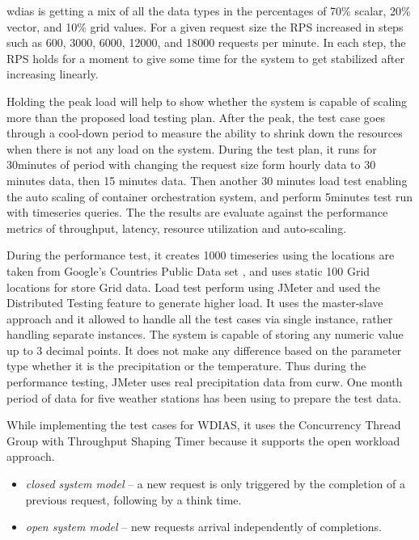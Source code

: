 \documentclass[conference]{IEEEtran}
\begin{document}
\acrshort{wdias} is getting a mix of all the data types in the percentages of 70\% scalar, 20\% vector, and 10\% grid values.
For a given request size the RPS increased in steps such as 600, 3000, 6000, 12000, and 18000 requests per minute. In each step, the RPS holds for a moment to give some time for the system to get stabilized after increasing linearly.

Holding the peak load will help to show whether the system is capable of scaling more than the proposed load testing plan. After the peak, the test case goes through a cool-down period to measure the ability to shrink down the resources when there is not any load on the system. During the test plan, it runs for 30minutes of period with changing the request size form hourly data to 30 minutes data, then 15 minutes data. Then another 30 minutes load test enabling the auto scaling of container orchestration system, and perform 5minutes test run with timeseries queries. The the results are evaluate against the performance metrics of throughput, latency, resource utilization and auto-scaling.

During the performance test, it creates 1000 timeseries using the locations are taken from Google's Countries Public Data set \cite{GoogleGoogleCounties}, and uses static 100 Grid locations for store Grid data. Load test perform using  JMeter and used the Distributed Testing feature to generate higher load. It uses the master-slave approach and it allowed to handle all the test cases via single instance, rather handling separate instances. The system is capable of storing any numeric value up to 3 decimal points. It does not make any difference based on the parameter type whether it is the precipitation or the temperature. Thus during the performance testing,  JMeter uses real precipitation data from \acrshort{curw}. One month period of data for five weather stations has been using to prepare the test data.

While implementing the test cases for WDIAS, it uses the Concurrency Thread Group
with Throughput Shaping Timer because it supports the open workload approach.

\begin{itemize}
    \item \emph{closed system model} \cite{Haggett1998AnWales} -- a new request is only triggered by the completion of a previous request, following by a think time.
    \item \emph{open system model} -- new requests arrival independently of completions.
\end{itemize}
\end{document}
